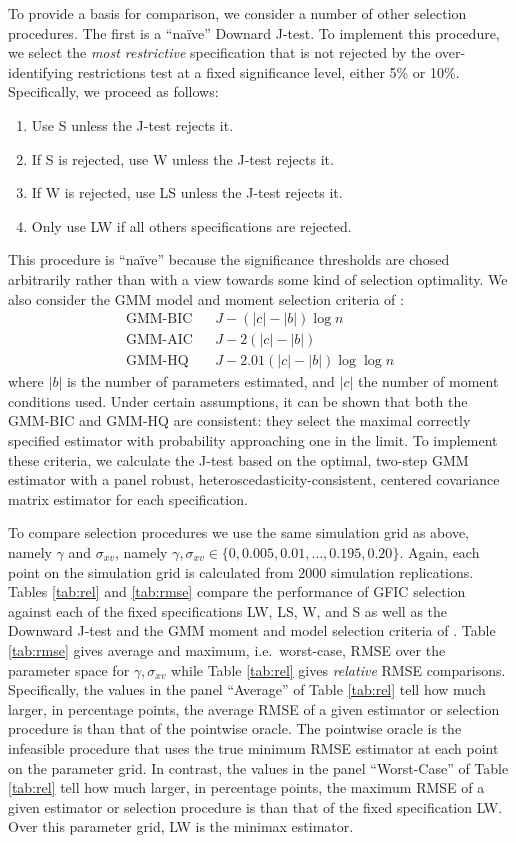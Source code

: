 To provide a basis for comparison, we consider a number of other selection procedures. 
The first is a ``na\"{i}ve'' Downard J-test. 
To implement this procedure, we select the \emph{most restrictive} specification that is not rejected by the over-identifying restrictions test at a fixed significance level, either 5\% or 10\%. 
Specifically, we proceed as follows:
\begin{enumerate}
\item Use S unless the J-test rejects it. 
\item If S  is rejected, use W unless the J-test rejects it. 
\item If W is rejected, use LS unless the J-test rejects it. 
\item Only use LW if all others specifications are rejected.
\end{enumerate}
This procedure is ``na\"{i}ve'' because the significance thresholds are chosed arbitrarily rather than with a view towards some kind of selection optimality. 
We also consider the GMM model and moment selection criteria of \cite{AndrewsLu}: 
	\begin{eqnarray*}
	 \mbox{GMM-BIC} && J - (|c| - |b|) \log{n}\\
	 \mbox{GMM-AIC}&& J - 2(|c| - |b|)\\ 
	 \mbox{GMM-HQ} && J - 2.01 (|c| - |b|)  \log{\log{n}}
	\end{eqnarray*}
where $|b|$ is the number of parameters estimated, and $|c|$ the number of moment conditions used. 
Under certain assumptions, it can be shown that both the GMM-BIC and GMM-HQ are consistent: they select the maximal correctly specified estimator with probability approaching one in the limit. 
To implement these criteria, we calculate the J-test based on the optimal, two-step GMM estimator with a panel robust, heteroscedasticity-consistent, centered covariance matrix estimator for each specification.

To compare selection procedures we use the same simulation grid as above, namely $\gamma$ and $\sigma_{xv}$, namely $\gamma, \sigma_{xv} \in \{0, 0.005, 0.01, \hdots, 0.195, 0.20\}$.  
Again, each point on the simulation grid is calculated from 2000 simulation replications. 
Tables \ref{tab:rel} and \ref{tab:rmse} compare the performance of GFIC selection against each of the fixed specifications LW, LS, W, and S as well as the Downward J-test and the GMM moment and model selection criteria of \cite{AndrewsLu}. 
Table \ref{tab:rmse} gives average and maximum, i.e.\ worst-case, RMSE over the parameter space for $\gamma, \sigma_{xv}$ while Table \ref{tab:rel} gives \emph{relative} RMSE comparisons. Specifically, the values in the panel ``Average'' of Table \ref{tab:rel} tell how much larger, in percentage points, the average RMSE of a given estimator or selection procedure is than that of the pointwise oracle. 
The pointwise oracle is the infeasible procedure that uses the true minimum RMSE estimator at each point on the parameter grid. 
In contrast, the values in the panel ``Worst-Case'' of Table \ref{tab:rel} tell how much larger, in percentage points, the maximum RMSE of a given estimator or selection procedure is than that of the fixed specification LW. 
Over this parameter grid, LW is the minimax estimator.

